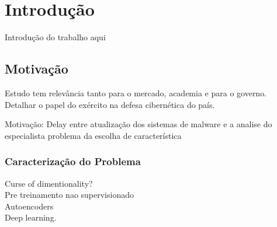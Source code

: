 %
%

\chapter{Introdu\c{c}\~{a}o}
Introdução do trabalho aqui

\section{Motiva\c{c}\~{a}o}
Estudo tem relevância tanto para o mercado, academia e para o governo. Detalhar o papel do exército na defesa cibernética do país. 

Motivação: Delay entre atualização dos sistemas de malware e a analise do especialista
problema da escolha de característica



\subsection{Caracteriza\c{c}\~{a}o do Problema}

Curse of dimentionality? \\
Pre treinamento nao supervisionado\\
Autoencoders\\
Deep learning.
